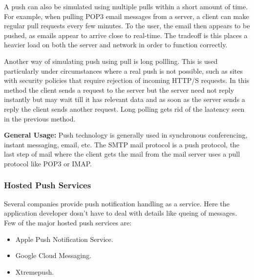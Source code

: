 A push can also be simulated using multiple pulls within a short amount of time. For example, when pulling POP3 email messages from a server, a client can make regular pull requests every few minutes. To the user, the email then appears to be pushed, as emails appear to arrive close to real-time. The tradeoff is this places a heavier load on both the server and network in order to function correctly.

Another way of simulating push using pull is long pollling. This is used particularly under circumstances where a real push is not possible, such as sites with security policies that require rejection of incoming HTTP/S requests. In this method the client sends a request to the server but the server need not reply instantly but may wait till it has relevant data and as soon as the server sends a reply the client sends another request. Long polling gets rid of the laatency seen in the previous method.

\textbf{General Usage: }Push technology is generally used in synchronous conferencing, instant messaging, email, etc. The SMTP mail protocol is a push protocol, the last step of mail where the client gets the mail from the mail server uses a pull protocol like POP3 or IMAP.
\subsubsection{Hosted Push Services} 
Several companies provide push notification handling as a service. Here the application developer dosn't have to deal with details like queing of messages. Few of the major hosted push services are:
\begin{itemize}
    \item Apple Push Notification Service.
    \item Google Cloud Messaging.
    \item Xtremepush.
  \end{itemize}
